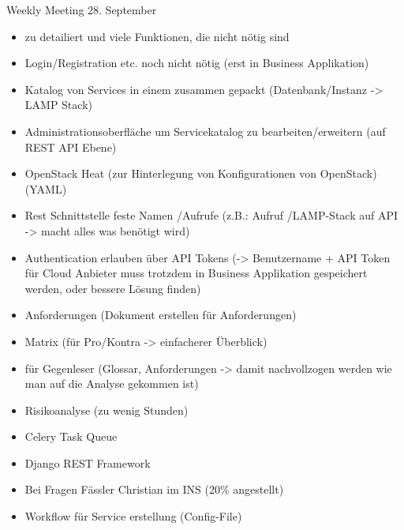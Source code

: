 \begin{Protokoll}{Weekly Meeting 28. September}
\protokollKopf

\begin{itemize}
  \item zu detailiert und viele Funktionen, die nicht nötig sind
  \item Login/Registration etc. noch nicht nötig (erst in Business Applikation)
\end{itemize}

\begin{itemize}
  \item Katalog von Services in einem zusammen gepackt (Datenbank/Instanz -> LAMP Stack)
  \item Administrationsoberfläche um Servicekatalog zu bearbeiten/erweitern (auf REST API Ebene)
  \item OpenStack Heat (zur Hinterlegung von Konfigurationen von OpenStack) (YAML)
  \item Rest Schnittstelle feste Namen /Aufrufe (z.B.: Aufruf /LAMP-Stack auf API -> macht alles was benötigt wird)
  \item Authentication erlauben über API Tokens (-> Benutzername + API Token für Cloud Anbieter 
  muss trotzdem in Business Applikation gespeichert werden, oder bessere Lösung finden)
\end{itemize}

\begin{itemize}
  \item Anforderungen (Dokument erstellen für Anforderungen)
  \item Matrix (für Pro/Kontra -> einfacherer Überblick)
  \item für Gegenleser (Glossar, Anforderungen -> damit nachvollzogen werden wie 
  man auf die Analyse gekommen ist)
  \item Risikoanalyse (zu wenig Stunden)
\end{itemize}

\begin{itemize}
  \item Celery Task Queue
  \item Django REST Framework
  \item Bei Fragen Fässler Christian im INS (20\% angestellt)
  \item Workflow für Service erstellung (Config-File)
\end{itemize}


\end{Protokoll}
